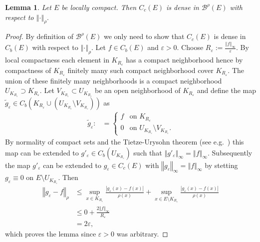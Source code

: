 \documentclass[a4paper,12pt]{article}
\newtheorem{lemma}[theorem]{Lemma}
\theoremstyle{definition}
\theoremstyle{remark}
\numberwithin{equation}{section}
\numberwithin{theorem}{section}
\begin{document}
\begin{lemma}
\label{lem:C_c dense in  B-rho for locally compact spaces}Let  $E$ be locally compact. Then $C_{c}(E)$
is dense in $\mathcal{\mathscr{B}}^{\rho}(E)$ with respect to $\left\Vert \cdot\right\Vert _{\rho}.$
\end{lemma}

\begin{proof}
By definition of $\mathcal{\mathscr{B}}^{\rho}(E)$ we only need to
show that $C_{c}(E)$ is dense in $C_{b}(E)$ with respect to $\left\Vert \cdot\right\Vert _{\rho}.$
Let $f\in C_{b}(E)$ and $\varepsilon>0$. Choose $R_{\varepsilon}:=\frac{\left\Vert f\right\Vert _{\infty}}{\varepsilon}$.
By local compactness each element in $K_{R_{\varepsilon}}$ has a
compact neighborhood hence by compactness of $K_{R_{\varepsilon}}$
finitely many such compact neighborhood cover $K_{R_{\varepsilon}}$.
The union of these finitely many neighborhoods is a compact neighborhood
$U_{K_{R_{\varepsilon}}}\supset K_{R_{\varepsilon}}.$ Let $V_{K_{R_{\varepsilon}}}\subset U_{K_{R_{\varepsilon}}}$
be an open neighborhood of $K_{R_{\varepsilon}}$ and define the map
$\tilde{g}_{\varepsilon}\in C_{b}(K_{R_{\varepsilon}}\cup (U_{K_{R_{\varepsilon}}}\setminus V_{K_{R_{\varepsilon}}}))$
as 
\begin{align*}
\tilde{g}_{\varepsilon}: & =\begin{cases}
f & \text{on }K_{R_{\varepsilon}}\\
0 & \text{on }U_{K_{R_{\varepsilon}}}\setminus V_{K_{R_{\varepsilon}}}.
\end{cases}
\end{align*}
By normality of compact sets and the Tietze-Urysohn theorem (see e.g.~\cite{kelley2017general}) this map can be extended to $g'_{\varepsilon}\in C_{b}(U_{K_{R_{\varepsilon}}})$
such that $\left\Vert g'_{\varepsilon}\right\Vert _{\infty}=\left\Vert f\right\Vert _{\infty}$.
Subsequently the map $g'_{\varepsilon}$ can be extended to $g_{\varepsilon}\in C_{c}(E)$
with $\left\Vert g_{\varepsilon}\right\Vert _{\infty}=\left\Vert f\right\Vert _{\infty}$
by stetting $g_{\varepsilon}\equiv0$ on $E\setminus U_{K_{R_{\varepsilon}}}$.
Then 
\begin{align*}
\left\Vert g_{\varepsilon}-f\right\Vert _{\rho} & \leq\underset{x\in K_{R_{\varepsilon}}}{\sup}\frac{\left|g_{\varepsilon}(x)-f(x)\right|}{\rho(x)}+\underset{x\in E\setminus K_{R_{\varepsilon}}}{\sup}\frac{\left|g_{\varepsilon}(x)-f(x)\right|}{\rho(x)}\\
 & \leq0+\frac{2\left\Vert f\right\Vert _{\infty}}{R_{\varepsilon}}\\
 & =2\varepsilon,
\end{align*}
which proves the lemma since $\varepsilon>0$ was arbitrary. 
\end{proof}
\end{document}
